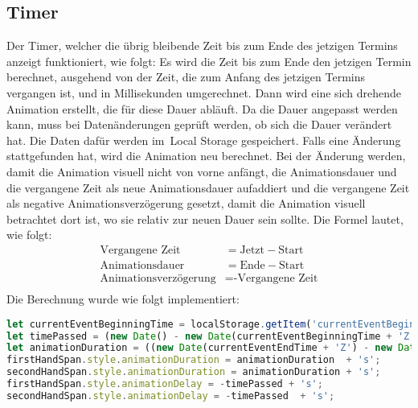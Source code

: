 \subsection{Timer}\label{subsec:timer}
Der Timer, welcher die übrig bleibende Zeit bis zum Ende des jetzigen Termins anzeigt funktioniert, wie folgt:
\newline
\newline
Es wird die Zeit bis zum Ende den jetzigen Termin berechnet, ausgehend von der Zeit, die zum Anfang des jetzigen Termins vergangen ist, und in Millisekunden umgerechnet.
Dann wird eine sich drehende Animation erstellt, die für diese Dauer abläuft.
\newline
Da die Dauer angepasst werden kann, muss bei Datenänderungen geprüft werden, ob sich die Dauer verändert hat.
Die Daten dafür werden im~\gls{Local Storage} gespeichert.
Falls eine Änderung stattgefunden hat, wird die Animation neu berechnet.
Bei der Änderung werden, damit die Animation visuell nicht von vorne anfängt, die Animationsdauer und die vergangene Zeit als neue Animationsdauer aufaddiert und die vergangene Zeit als negative Animationsverzögerung gesetzt, damit die Animation visuell betrachtet dort ist, wo sie relativ zur neuen Dauer sein sollte.
\newline
\newline
Die Formel lautet, wie folgt:
\newline
\newline
\begin{equation}
\begin{aligned}
    \text{Vergangene Zeit} &= \text{Jetzt} - \text{Start} \\
\text{Animationsdauer} &= \text{Ende} - \text{Start} \\
    \text {Animationsverzögerung} &= \text{-Vergangene Zeit} \\
\end{aligned}\label{eq:equation}
\end{equation}
\newline
\newline
Die Berechnung wurde wie folgt implementiert:
\newline
\newline
\newpage
\begin{lstlisting}[language=JavaScript,label={lst:JavaScript Timer}]
let currentEventBeginningTime = localStorage.getItem('currentEventBeginningTime');
let timePassed = (new Date() - new Date(currentEventBeginningTime + 'Z')) / 1000;
let animationDuration = ((new Date(currentEventEndTime + 'Z') - new Date(currentEventBeginningTime + 'Z')) / 1000);
firstHandSpan.style.animationDuration = animationDuration  + 's';
secondHandSpan.style.animationDuration = animationDuration + 's';
firstHandSpan.style.animationDelay = -timePassed + 's';
secondHandSpan.style.animationDelay = -timePassed  + 's';
\end{lstlisting}
